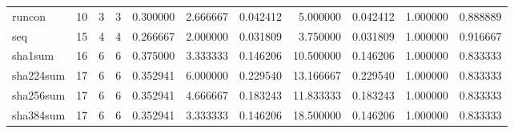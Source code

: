 \begin{longtable}{lrrrrrrrrrr}
runcon    &                                      10 &                  3 &                                 3 &                                   0.300000 &                               2.666667 &                                     0.042412 &                          5.000000 &                                0.042412 &                           1.000000 &                                           0.888889 \\
seq       &                                      15 &                  4 &                                 4 &                                   0.266667 &                               2.000000 &                                     0.031809 &                          3.750000 &                                0.031809 &                           1.000000 &                                           0.916667 \\
sha1sum   &                                      16 &                  6 &                                 6 &                                   0.375000 &                               3.333333 &                                     0.146206 &                         10.500000 &                                0.146206 &                           1.000000 &                                           0.833333 \\
sha224sum &                                      17 &                  6 &                                 6 &                                   0.352941 &                               6.000000 &                                     0.229540 &                         13.166667 &                                0.229540 &                           1.000000 &                                           0.833333 \\
sha256sum &                                      17 &                  6 &                                 6 &                                   0.352941 &                               4.666667 &                                     0.183243 &                         11.833333 &                                0.183243 &                           1.000000 &                                           0.833333 \\
sha384sum &                                      17 &                  6 &                                 6 &                                   0.352941 &                               3.333333 &                                     0.146206 &                         18.500000 &                                0.146206 &                           1.000000 &                                           0.833333 \\

\end{longtable}
